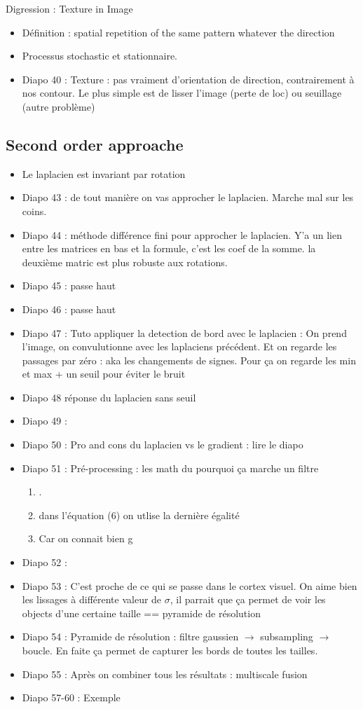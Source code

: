 \documentclass{article}
\theoremstyle{plain}%
\theoremstyle{definition}
\theoremstyle{remark}
\begin{document}
Digression : Texture in Image 
\begin{itemize}
    \item Définition : spatial repetition of the same pattern whatever the direction
    \item Processus stochastic et stationnaire. 
    \item Diapo 40 : Texture : pas vraiment d'orientation de direction, contrairement à nos contour. Le plus simple est de lisser l'image (perte de loc) ou seuillage (autre problème)
\end{itemize}

\subsection{Second order approache}
\begin{itemize}
    \item Le laplacien est invariant par rotation 
    \item Diapo 43 : de tout manière on vas approcher le laplacien. Marche mal sur les coins. 
    \item Diapo 44 : méthode différence fini pour approcher le laplacien. Y'a un lien entre les matrices en bas et la formule, c'est les coef de la somme. la deuxième matric est plus robuste aux rotations.
    \item Diapo 45 : passe haut 
    \item Diapo 46 : passe haut 
    \item Diapo 47 : Tuto appliquer la detection de bord avec le laplacien : On prend l'image, on convulutionne avec les laplaciens précédent. Et on regarde les passages par zéro : aka les changements de signes. Pour ça on regarde les min et max + un seuil pour éviter le bruit
    \item Diapo 48 réponse du laplacien sans seuil 
    \item Diapo 49 : 
    \item Diapo 50 : Pro and cons du laplacien vs le gradient : lire le diapo
    \item Diapo 51 : Pré-processing : les math du pourquoi ça marche un filtre \begin{enumerate}
        \item .
        \item dans l'équation (6) on utlise la dernière égalité 
        \item Car on connait bien g
    \end{enumerate}
    \item Diapo 52 : 
    \item Diapo 53 : C'est proche de ce qui se passe dans le cortex visuel. On aime bien les lissages à différente valeur de $ \sigma  $, il parrait que ça permet de voir les objects d'une certaine taille == pyramide de résolution
    \item Diapo 54 : Pyramide de résolution : filtre gaussien $\rightarrow$ subsampling $\rightarrow$boucle. En faite ça permet de capturer les bords de toutes les tailles.
    \item Diapo 55 : Après on combiner tous les résultats : multiscale fusion
    \item Diapo 57-60 : Exemple 
\end{itemize}
\end{document}
